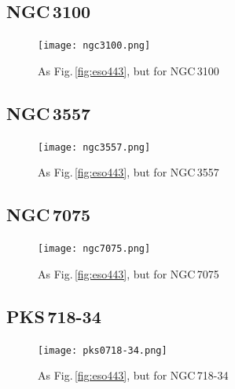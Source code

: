 \documentclass[a4paper,fleqn,usenatbib]{mnras}
\begin{document}
	\subsection{NGC\,3100}
		\begin{figure}
			\centering
			\texttt{[image: ngc3100.png]}
			\caption{As Fig.\,\ref{fig:eso443}, but for NGC\,3100}
		\end{figure}

	\subsection{NGC\,3557}
		\begin{figure}
			\centering
			\texttt{[image: ngc3557.png]}
			\caption{As Fig.\,\ref{fig:eso443}, but for NGC\,3557}
		\end{figure}

	\subsection{NGC\,7075}
		\begin{figure}
			\centering
			\texttt{[image: ngc7075.png]}
			\caption{As Fig.\,\ref{fig:eso443}, but for NGC\,7075}
		\end{figure}

	\subsection{PKS\,718-34}
		\begin{figure}
			\centering
			\texttt{[image: pks0718-34.png]}
			\caption{As Fig.\,\ref{fig:eso443}, but for NGC\,718-34}
		\end{figure}
\end{document}
